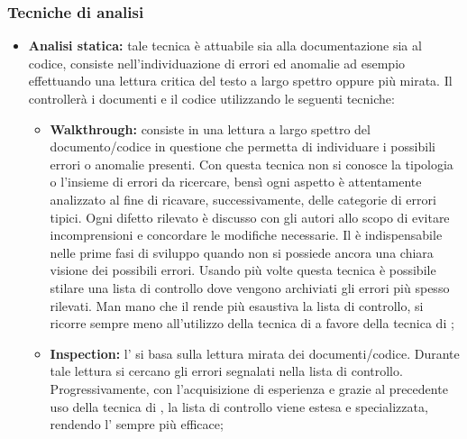 \documentclass[12pt,a4paper]{article}
\begin{document}
\subsubsection{Tecniche di analisi}
\begin{itemize}
  \item \textbf{Analisi statica:} tale tecnica è attuabile sia alla documentazione sia al codice, consiste nell'individuazione di errori ed anomalie ad esempio effettuando una lettura critica del testo a largo spettro oppure più mirata. Il \VR controllerà i documenti e il codice utilizzando le seguenti tecniche:
    \begin{itemize}
      \item \textbf{Walkthrough:} consiste in una lettura a largo spettro del documento/codice in questione che permetta di individuare i possibili errori o anomalie presenti. Con questa tecnica non si conosce la tipologia o l'insieme di errori da ricercare, bensì ogni aspetto è attentamente analizzato al fine di ricavare, successivamente, delle categorie di errori tipici. Ogni difetto rilevato è discusso con gli autori allo scopo di evitare incomprensioni e concordare le modifiche necessarie. Il  è indispensabile nelle prime fasi di sviluppo quando non si possiede ancora una chiara visione dei possibili errori. Usando più volte questa tecnica è possibile stilare una lista di controllo dove vengono archiviati gli errori più spesso rilevati. Man mano che il \VR rende più esaustiva la lista di controllo, si ricorre sempre meno all'utilizzo della tecnica di  a favore della tecnica di ;
      \item \textbf{Inspection:} l' si basa sulla lettura mirata dei documenti/codice. Durante tale lettura si cercano gli errori segnalati nella lista di controllo. Progressivamente, con l'acquisizione di esperienza e grazie al precedente uso della tecnica di , la lista di controllo viene estesa e specializzata, rendendo l' sempre più efficace;
        \end{itemize}
\end{itemize}
\end{document}
